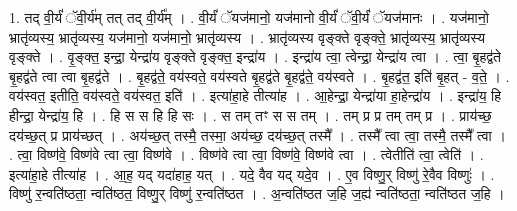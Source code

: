 \documentclass[17pt]{extarticle}
\begin{document}
1. तद् वी॒र्यं॑ ॅवी॒र्य॑म् तत् तद् वी॒र्य᳚म् । . वी॒र्यं॑ ॅयज॑मानो॒ यज॑मानो वी॒र्यं॑ ॅवी॒र्यं॑ ॅयज॑मानः । . यज॑मानो॒ भ्रातृ॑व्यस्य॒ भ्रातृ॑व्यस्य॒ यज॑मानो॒ यज॑मानो॒ भ्रातृ॑व्यस्य । . भ्रातृ॑व्यस्य वृङ्क्ते वृङ्क्ते॒ भ्रातृ॑व्यस्य॒ भ्रातृ॑व्यस्य वृङ्क्ते । . वृ॒ङ्क्त॒ इन्द्रा॒ येन्द्रा॑य वृङ्क्ते वृङ्क्त॒ इन्द्रा॑य । . इन्द्रा॑य त्वा॒ त्वेन्द्रा॒ येन्द्रा॑य त्वा । . त्वा॒ बृ॒हद्व॑ते बृ॒हद्व॑ते त्वा त्वा बृ॒हद्व॑ते । . बृ॒हद्व॑ते॒ वय॑स्वते॒ वय॑स्वते बृ॒हद्व॑ते बृ॒हद्व॑ते॒ वय॑स्वते । . बृ॒हद्व॑त॒ इति॑ बृ॒हत् - व॒ते॒ । . वय॑स्वत॒ इतीति॒ वय॑स्वते॒ वय॑स्वत॒ इति॑ । . इत्या॑हा॒हे तीत्या॑ह । . आ॒हेन्द्रा॒ येन्द्रा॑या हा॒हेन्द्रा॑य । . इन्द्रा॑य॒ हि हीन्द्रा॒ येन्द्रा॑य॒ हि । . हि स स हि हि सः । . स तम् तꣳ स स तम् । . तम् प्र प्र तम् तम् प्र । . प्राय॑च्छ॒ दय॑च्छ॒त् प्र प्राय॑च्छत् । . अय॑च्छ॒त् तस्मै॒ तस्मा॒ अय॑च्छ॒ दय॑च्छ॒त् तस्मै᳚ । . तस्मै᳚ त्वा त्वा॒ तस्मै॒ तस्मै᳚ त्वा । . त्वा॒ विष्ण॑वे॒ विष्ण॑वे त्वा त्वा॒ विष्ण॑वे । . विष्ण॑वे त्वा त्वा॒ विष्ण॑वे॒ विष्ण॑वे त्वा । . त्वेतीति॑ त्वा॒ त्वेति॑ । . इत्या॑हा॒हे तीत्या॑ह । . आ॒ह॒ यद् यदा॑हाह॒ यत् । . यदे॒ वैव यद् यदे॒व । . ए॒व विष्णु॒र् विष्णु॑ रे॒वैव विष्णुः॑ । . विष्णु॑ र॒न्वति॑ष्ठता॒ न्वति॑ष्ठत॒ विष्णु॒र् विष्णु॑ र॒न्वति॑ष्ठत । . अ॒न्वति॑ष्ठत ज॒हि ज॒ह्य॑ न्वति॑ष्ठता॒ न्वति॑ष्ठत ज॒हि । \newline
\end{document}
